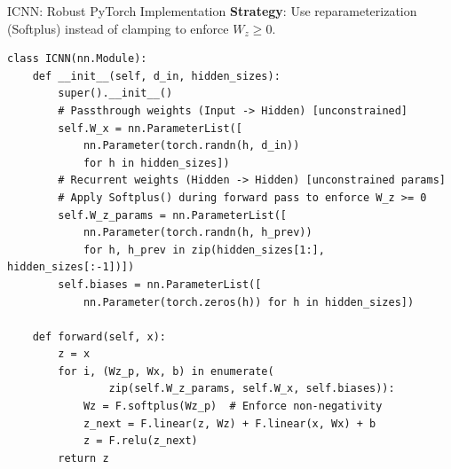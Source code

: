\documentclass[10pt,english,aspectratio=169]{beamer}
\begin{document}
\begin{frame}[fragile]{ICNN: Robust PyTorch Implementation}
\textbf{Strategy}: Use reparameterization (Softplus) instead of clamping to enforce $W_z \geq 0$.
\vspace{-0.2cm}
\begin{lstlisting}[style=pythonstyle,basicstyle=\ttfamily\tiny]
class ICNN(nn.Module):
    def __init__(self, d_in, hidden_sizes):
        super().__init__()
        # Passthrough weights (Input -> Hidden) [unconstrained]
        self.W_x = nn.ParameterList([
            nn.Parameter(torch.randn(h, d_in))
            for h in hidden_sizes])
        # Recurrent weights (Hidden -> Hidden) [unconstrained params]
        # Apply Softplus() during forward pass to enforce W_z >= 0
        self.W_z_params = nn.ParameterList([
            nn.Parameter(torch.randn(h, h_prev))
            for h, h_prev in zip(hidden_sizes[1:], hidden_sizes[:-1])])
        self.biases = nn.ParameterList([
            nn.Parameter(torch.zeros(h)) for h in hidden_sizes])

    def forward(self, x):
        z = x
        for i, (Wz_p, Wx, b) in enumerate(
                zip(self.W_z_params, self.W_x, self.biases)):
            Wz = F.softplus(Wz_p)  # Enforce non-negativity
            z_next = F.linear(z, Wz) + F.linear(x, Wx) + b
            z = F.relu(z_next)
        return z
\end{lstlisting}
\end{frame}
\end{document}
